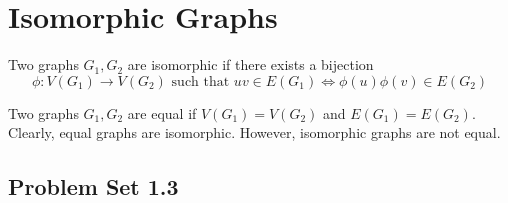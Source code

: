 \section{Isomorphic Graphs}
\begin{definition}[isomorphism]
	Two graphs $G_1,G_2$ are isomorphic if there exists a bijection $$\phi : V(G_1) \to V(G_2) \text{ such that }uv \in E(G_1) \iff \phi(u)\phi(v) \in E(G_2)$$
\end{definition}
\begin{remark}
	Two graphs $G_1,G_2$ are equal if $V(G_1) = V(G_2)$ and $E(G_1) = E(G_2)$. Clearly, equal graphs are isomorphic. However, isomorphic graphs are not equal.
\end{remark}

\subsection*{Problem Set 1.3}
